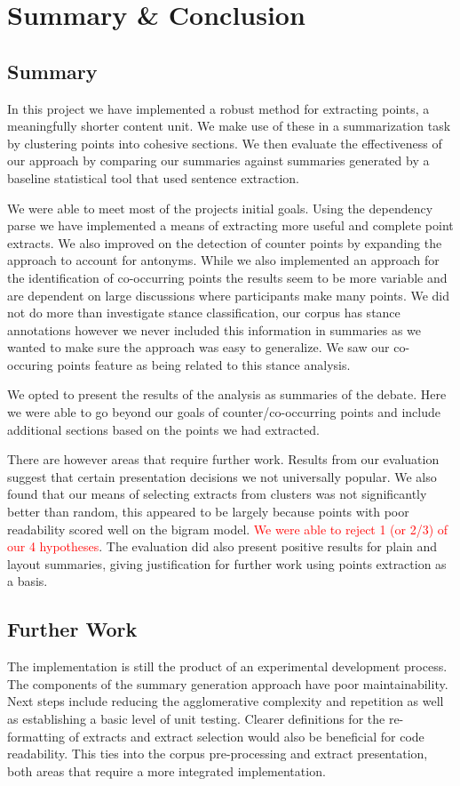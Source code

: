 \chapter{Summary \& Conclusion \label{chap:conclusion}}
  \section{Summary}
    In this project we have implemented a robust method for extracting points, a meaningfully shorter content unit. We make use of these in a summarization task by clustering points into cohesive sections. We then evaluate the effectiveness of our approach by comparing our summaries against summaries generated by a baseline statistical tool that used sentence extraction.

    We were able to meet most of the projects initial goals. Using the dependency parse we have implemented a means of extracting more useful and complete point extracts. We also improved on the detection of counter points by expanding the approach to account for antonyms. While we also implemented an approach for the identification of co-occurring points the results seem to be more variable and are dependent on large discussions where participants make many points. We did not do more than investigate stance classification, our corpus has stance annotations however we never included this information in summaries as we wanted to make sure the approach was easy to generalize. We saw our co-occuring points feature as being related to this stance analysis.

    We opted to present the results of the analysis as summaries of the debate. Here we were able to go beyond our goals of counter/co-occurring points and include additional sections based on the points we had extracted.

    There are however areas that require further work. Results from our evaluation suggest that certain presentation decisions we not universally popular. We also found that our means of selecting extracts from clusters was not significantly better than random, this appeared to be largely because points with poor readability scored well on the bigram model. \textcolor{red}{We were able to reject 1 (or 2/3) of our 4 hypotheses}. The evaluation did also present positive results for plain and layout summaries, giving justification for further work using points extraction as a basis.

  \section{Further Work}
    The implementation is still the product of an experimental development process. The components of the summary generation approach have poor maintainability. Next steps include reducing the agglomerative complexity and repetition as well as establishing a basic level of unit testing. Clearer definitions for the re-formatting of extracts and extract selection would also be beneficial for code readability. This ties into the corpus pre-processing and extract presentation, both areas that require a more integrated implementation.

